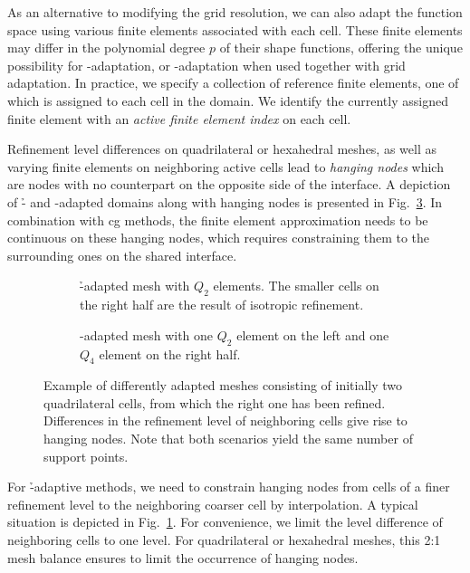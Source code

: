 As an alternative to modifying the grid resolution, we can also adapt the function space using various finite elements associated with each cell. These finite elements may differ in the polynomial degree $p$ of their shape functions, offering the unique possibility for \p-adaptation, or \hp-adaptation when used together with grid adaptation. In practice, we specify a collection of reference finite elements, one of which is assigned to each cell in the domain. We identify the currently assigned finite element with an \textit{active finite element index} on each cell.

Refinement level differences on quadrilateral or hexahedral meshes, as well as varying finite elements on neighboring active cells lead to \textit{hanging nodes} which are nodes with no counterpart on the opposite side of the interface. A depiction of \h- and \p-adapted domains along with hanging nodes is presented in Fig.~\ref{fig:hpadaptivity}.
In combination with \gls{cg} methods, the finite element approximation needs to be continuous on these hanging nodes, which requires constraining them to the surrounding ones on the shared interface.

\begin{figure}
\begin{subfigure}[t]{0.48\textwidth}
  \centering
  
  \caption{\h-adapted mesh with $Q_2$ elements. The smaller cells on the right half are the result of isotropic refinement.}
  \label{fig:hapaptivity}
\end{subfigure}
\hfill{}
\begin{subfigure}[t]{0.48\textwidth}
  \centering
  
  \caption{\p-adapted mesh with one $Q_2$ element on the left and one $Q_4$ element on the right half.}
  \label{fig:papaptivity}
\end{subfigure}
\caption[Differences between \h- and \p-adaptation.]{Example of differently adapted meshes consisting of initially two quadrilateral cells, from which the right one has been refined. Differences in the refinement level of neighboring cells give rise to hanging nodes. Note that both scenarios yield the same number of support points.}
\label{fig:hpadaptivity}
\end{figure}

For \h-adaptive methods, we need to constrain hanging nodes from cells of a finer refinement level to the neighboring coarser cell by interpolation. A typical situation is depicted in Fig.~\ref{fig:hapaptivity}. For convenience, we limit the level difference of neighboring cells to one level.
For quadrilateral or hexahedral meshes, this 2:1 mesh balance ensures to limit the occurrence of hanging nodes.

